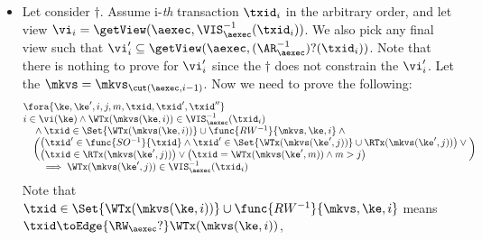 \begin{itemize}
\item Let consider \( \dagger \).
Assume i-\emph{th} transaction \( \txid_i \) in the arbitrary order,
and let view \( \vi_{i} = \getView(\aexec, \VIS^{-1}_{\aexec}(\txid_{i}) ) \).
We also pick any final view such that \( \vi'_{i} \subseteq \getView(\aexec, (\AR^{-1}_{\aexec})?(\txid_{i}) ) \).
Note that there is nothing to prove for \( \vi'_i \) since the \( \dagger \) does not constrain the \( \vi'_i \).
Let the \( \mkvs = \mkvs_{\cut(\aexec, i-1)} \).
Now we need to prove the following:
\begin{gather}
    \label{equ:si-complete-arvis}
    \begin{array}{@{}l@{}}
        \fora{\ke, \ke', i, j, m, \txid, \txid', \txid''} \\
        \begin{array}{@{}l@{}}
        i \in \vi(\ke) 
        \land \WTx(\mkvs(\ke,i)) \in \VIS^{-1}_{\aexec}(\txid_{i})  \\
        \quad {} \land \txid \in \Set{\WTx(\mkvs(\ke,i))} \cup \func{RW^{-1}}{\mkvs, \ke, i} \land {} \\
            \quad \left(
                \begin{array}{@{}l @{}}
                    \left( \begin{array}{@{}l@{}}
                        \txid' \in \func{SO^{-1}}{\txid}
                        \land \txid' \in \Set{\WTx(\mkvs(\ke',j))} \cup  \RTx(\mkvs(\ke',j))
                    \end{array} \right)  \lor {} \\
                    \left( \begin{array}{@{}l@{}}
                        \txid \in \RTx(\mkvs(\ke',j)) 
                    \end{array} \right) \lor 
                    \left( \begin{array}{@{}l@{}}
                        \txid = \WTx(\mkvs(\ke',m)) 
                        \land m > j
                    \end{array} \right) 
                \end{array}
                \right)  \\
        \qquad \implies \WTx(\mkvs(\ke',j)) \in \VIS^{-1}_{\aexec}(\txid_{i})
        \end{array} 
    \end{array} 
\end{gather}
Note that \( \txid \in \Set{\WTx(\mkvs(\ke,i))} \cup \func{RW^{-1}}{\mkvs, \ke, i} \) 
means \( \txid \toEdge{\RW_{\aexec}?} \WTx(\mkvs(\ke,i)) \),

\end{itemize}
